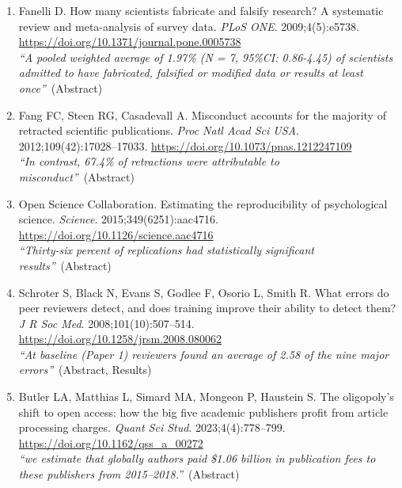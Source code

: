 \documentclass[12pt]{article}
\begin{document}
\vspace{12pt}
{\fontsize{10.5}{13.5}\selectfont\setlength{\parskip}{0pt}
\par\vspace{4pt}
\begin{enumerate}[leftmargin=1.8em,itemsep=5pt,topsep=0pt,label=\arabic*.]
\item \hypertarget{ref-fanelli2009}{}Fanelli D. How many scientists fabricate and falsify research? A systematic review and meta-analysis of survey data. \textit{PLoS ONE}. 2009;4(5):e5738. \url{https://doi.org/10.1371/journal.pone.0005738}\\[1pt]{\color{quote}\itshape ``A pooled weighted average of 1.97\% (N = 7, 95\%CI: 0.86-4.45) of scientists admitted to have fabricated, falsified or modified data or results at least once''}~{\color{quote}\footnotesize(Abstract)}
\item \hypertarget{ref-fang2012}{}Fang FC, Steen RG, Casadevall A. Misconduct accounts for the majority of retracted scientific publications. \textit{Proc Natl Acad Sci USA}. 2012;109(42):17028--17033. \url{https://doi.org/10.1073/pnas.1212247109}\\[1pt]{\color{quote}\itshape ``In contrast, 67.4\% of retractions were attributable to misconduct''}~{\color{quote}\footnotesize(Abstract)}
\item \hypertarget{ref-osc2015}{}Open Science Collaboration. Estimating the reproducibility of psychological science. \textit{Science}. 2015;349(6251):aac4716. \url{https://doi.org/10.1126/science.aac4716}\\[1pt]{\color{quote}\itshape ``Thirty-six percent of replications had statistically significant results''}~{\color{quote}\footnotesize(Abstract)}
\item \hypertarget{ref-schroter2008}{}Schroter S, Black N, Evans S, Godlee F, Osorio L, Smith R. What errors do peer reviewers detect, and does training improve their ability to detect them? \textit{J R Soc Med}. 2008;101(10):507--514. \url{https://doi.org/10.1258/jrsm.2008.080062}\\[1pt]{\color{quote}\itshape ``At baseline (Paper 1) reviewers found an average of 2.58 of the nine major errors''}~{\color{quote}\footnotesize(Abstract, Results)}
\item \hypertarget{ref-butler2023}{}Butler LA, Matthias L, Simard MA, Mongeon P, Haustein S. The oligopoly's shift to open access: how the big five academic publishers profit from article processing charges. \textit{Quant Sci Stud}. 2023;4(4):778--799. \url{https://doi.org/10.1162/qss_a_00272}\\[1pt]{\color{quote}\itshape ``we estimate that globally authors paid \$1.06 billion in publication fees to these publishers from 2015--2018.''}~{\color{quote}\footnotesize(Abstract)}

\end{enumerate}}
\end{document}

